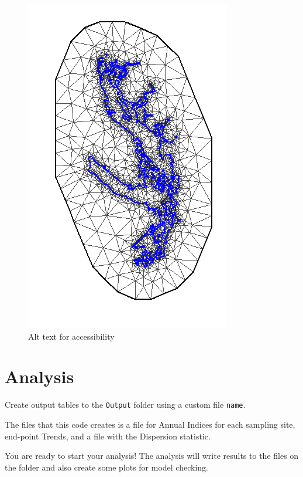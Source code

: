 \documentclass[
  letterpaper,
  DIV=11,
  numbers=noendperiod]{scrreprt}
\begin{document}
\begin{figure}[H]

{\centering \includegraphics{Images/SPDEModelMesh.png}

}

\caption{Alt text for accessibility}

\end{figure}%

\section{Analysis}\label{3.2Analysis}

Create output tables to the \texttt{Output} folder using a custom file
\texttt{name}.

The files that this code creates is a file for Annual Indices for each
sampling site, end-point Trends, and a file with the Dispersion
statistic.

You are ready to start your analysis! The analysis will write results to
the files on the folder and also create some plots for model checking.
\end{document}
